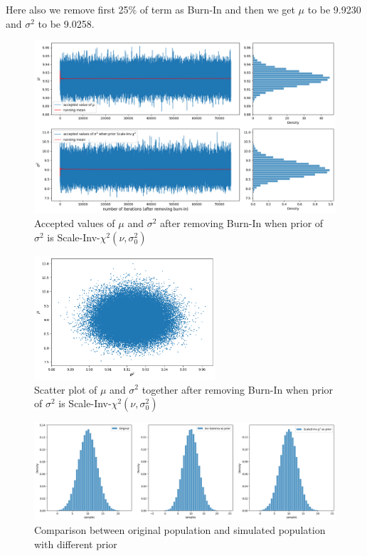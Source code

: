 \begin{example}
    Here also we remove first 25\% of term as Burn-In and then we get $ \mu $ to be 9.9230 and $ \sigma^{2} $ to be 9.0258.  
    
    \begin{figure}[H]
        \centering
        \includegraphics[width=1\textwidth]{images/gibbs/example3/chi2-post-burnin.png}
        \caption{Accepted values of $ \mu $ and $ \sigma^{2} $ after removing Burn-In when prior of $ \sigma^{2} $ is Scale-Inv-$\chi^{2}(\nu,\sigma^{2}_0)$}
    \end{figure}

    \begin{figure}[H]
        \centering
        \includegraphics[width=0.6\textwidth]{images/gibbs/example3/chi2-scatter-post-burnin.png}
        \caption{Scatter plot of $ \mu $ and $ \sigma^{2} $ together after removing Burn-In when prior of $ \sigma^{2} $ is Scale-Inv-$\chi^{2}(\nu,\sigma^{2}_0)$}
    \end{figure}

    \begin{figure}[H]
        \centering
        \includegraphics[width=1\textwidth]{images/gibbs/example3/comparisum.png}
        \caption{Comparison between original population and simulated population with different prior}
    \end{figure}

 \end{example}


